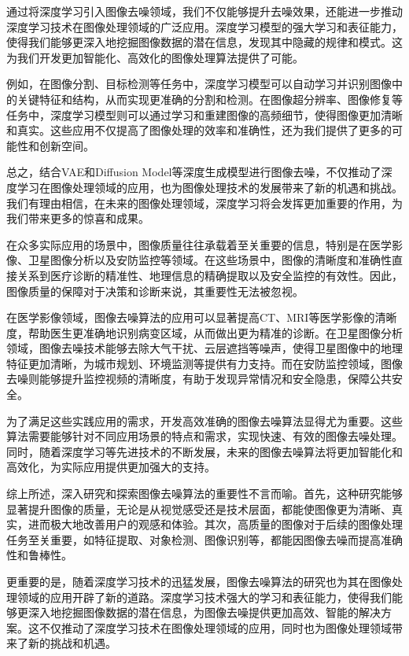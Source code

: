 通过将深度学习引入图像去噪领域，我们不仅能够提升去噪效果，还能进一步推动深度学习技术在图像处理领域的广泛应用。深度学习模型的强大学习和表征能力，使得我们能够更深入地挖掘图像数据的潜在信息，发现其中隐藏的规律和模式。这为我们开发更加智能化、高效化的图像处理算法提供了可能。

例如，在图像分割、目标检测等任务中，深度学习模型可以自动学习并识别图像中的关键特征和结构，从而实现更准确的分割和检测。在图像超分辨率、图像修复等任务中，深度学习模型则可以通过学习和重建图像的高频细节，使得图像更加清晰和真实。这些应用不仅提高了图像处理的效率和准确性，还为我们提供了更多的可能性和创新空间。

总之，结合VAE和Diffusion Model等深度生成模型进行图像去噪，不仅推动了深度学习在图像处理领域的应用，也为图像处理技术的发展带来了新的机遇和挑战。我们有理由相信，在未来的图像处理领域，深度学习将会发挥更加重要的作用，为我们带来更多的惊喜和成果。          



在众多实际应用的场景中，图像质量往往承载着至关重要的信息，特别是在医学影像、卫星图像分析以及安防监控等领域。在这些场景中，图像的清晰度和准确性直接关系到医疗诊断的精准性、地理信息的精确提取以及安全监控的有效性。因此，图像质量的保障对于决策和诊断来说，其重要性无法被忽视。

在医学影像领域，图像去噪算法的应用可以显著提高CT、MRI等医学影像的清晰度，帮助医生更准确地识别病变区域，从而做出更为精准的诊断。在卫星图像分析领域，图像去噪技术能够去除大气干扰、云层遮挡等噪声，使得卫星图像中的地理特征更加清晰，为城市规划、环境监测等提供有力支持。而在安防监控领域，图像去噪则能够提升监控视频的清晰度，有助于发现异常情况和安全隐患，保障公共安全。

为了满足这些实践应用的需求，开发高效准确的图像去噪算法显得尤为重要。这些算法需要能够针对不同应用场景的特点和需求，实现快速、有效的图像去噪处理。同时，随着深度学习等先进技术的不断发展，未来的图像去噪算法将更加智能化和高效化，为实际应用提供更加强大的支持。     


      综上所述，深入研究和探索图像去噪算法的重要性不言而喻。首先，这种研究能够显著提升图像的质量，无论是从视觉感受还是技术层面，都能使图像更为清晰、真实，进而极大地改善用户的观感和体验。其次，高质量的图像对于后续的图像处理任务至关重要，如特征提取、对象检测、图像识别等，都能因图像去噪而提高准确性和鲁棒性。

更重要的是，随着深度学习技术的迅猛发展，图像去噪算法的研究也为其在图像处理领域的应用开辟了新的道路。深度学习技术强大的学习和表征能力，使得我们能够更深入地挖掘图像数据的潜在信息，为图像去噪提供更加高效、智能的解决方案。这不仅推动了深度学习技术在图像处理领域的应用，同时也为图像处理领域带来了新的挑战和机遇。

